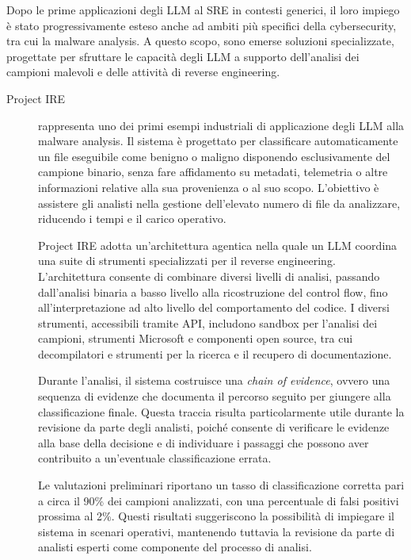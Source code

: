 Dopo le prime applicazioni degli LLM al SRE in contesti generici, il loro impiego è stato progressivamente esteso anche ad ambiti più specifici della cybersecurity, tra cui la malware analysis. A questo scopo, sono emerse soluzioni specializzate, progettate per sfruttare le capacità degli LLM a supporto dell'analisi dei campioni malevoli e delle attività di reverse engineering.

\begin{description}
    \item[Project IRE \cite{caswell2025projectire}] rappresenta uno dei primi esempi industriali di applicazione degli LLM alla malware analysis. Il sistema è progettato per classificare automaticamente un file eseguibile come benigno o maligno disponendo esclusivamente del campione binario, senza fare affidamento su metadati, telemetria o altre informazioni relative alla sua provenienza o al suo scopo. L'obiettivo è assistere gli analisti nella gestione dell'elevato numero di file da analizzare, riducendo i tempi e il carico operativo.

    Project IRE adotta un'architettura agentica nella quale un LLM coordina una suite di strumenti specializzati per il reverse engineering. L'architettura consente di combinare diversi livelli di analisi, passando dall'analisi binaria a basso livello alla ricostruzione del control flow, fino all'interpretazione ad alto livello del comportamento del codice. I diversi strumenti, accessibili tramite API, includono sandbox per l'analisi dei campioni, strumenti Microsoft e componenti open source, tra cui decompilatori e strumenti per la ricerca e il recupero di documentazione.

    Durante l'analisi, il sistema costruisce una \textit{chain of evidence}, ovvero una sequenza di evidenze che documenta il percorso seguito per giungere alla classificazione finale. Questa traccia risulta particolarmente utile durante la revisione da parte degli analisti, poiché consente di verificare le evidenze alla base della decisione e di individuare i passaggi che possono aver contribuito a un'eventuale classificazione errata.

    Le valutazioni preliminari riportano un tasso di classificazione corretta pari a circa il 90\% dei campioni analizzati, con una percentuale di falsi positivi prossima al 2\%. Questi risultati suggeriscono la possibilità di impiegare il sistema in scenari operativi, mantenendo tuttavia la revisione da parte di analisti esperti come componente del processo di analisi.


\end{description}
